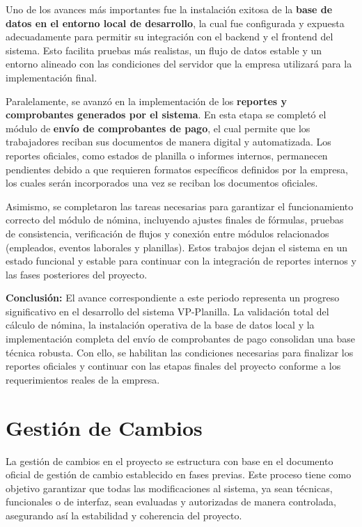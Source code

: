 Uno de los avances más importantes fue la instalación exitosa de la \textbf{base de datos en el entorno local de desarrollo}, la cual fue configurada y expuesta adecuadamente para permitir su integración con el backend y el frontend del sistema. Esto facilita pruebas más realistas, un flujo de datos estable y un entorno alineado con las condiciones del servidor que la empresa utilizará para la implementación final.

Paralelamente, se avanzó en la implementación de los \textbf{reportes y comprobantes generados por el sistema}. En esta etapa se completó el módulo de \textbf{envío de comprobantes de pago}, el cual permite que los trabajadores reciban sus documentos de manera digital y automatizada.
Los reportes oficiales, como estados de planilla o informes internos, permanecen pendientes debido a que requieren formatos específicos definidos por la empresa, los cuales serán incorporados una vez se reciban los documentos oficiales.

Asimismo, se completaron las tareas necesarias para garantizar el funcionamiento correcto del módulo de nómina, incluyendo ajustes finales de fórmulas, pruebas de consistencia, verificación de flujos y conexión entre módulos relacionados (empleados, eventos laborales y planillas). Estos trabajos dejan el sistema en un estado funcional y estable para continuar con la integración de reportes internos y las fases posteriores del proyecto.

\textbf{Conclusión:}
El avance correspondiente a este periodo representa un progreso significativo en el desarrollo del sistema VP-Planilla. La validación total del cálculo de nómina, la instalación operativa de la base de datos local y la implementación completa del envío de comprobantes de pago consolidan una base técnica robusta. Con ello, se habilitan las condiciones necesarias para finalizar los reportes oficiales y continuar con las etapas finales del proyecto conforme a los requerimientos reales de la empresa.


\section{Gestión de Cambios}

La gestión de cambios en el proyecto se estructura con base en el documento oficial
de gestión de cambio establecido en fases previas. Este proceso tiene como objetivo
garantizar que todas las modificaciones al sistema, ya sean técnicas, funcionales o de
interfaz, sean evaluadas y autorizadas de manera controlada, asegurando así la estabilidad
y coherencia del proyecto.

